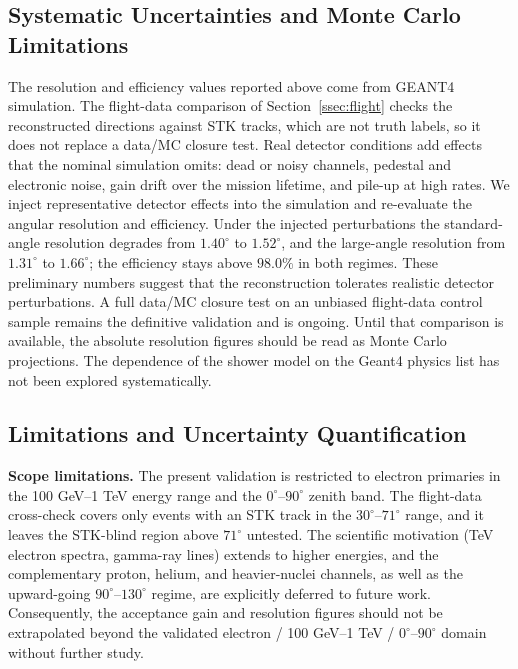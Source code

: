 \documentclass[preprint,12pt]{elsarticle}
\begin{document}
\subsection{Systematic Uncertainties and Monte Carlo Limitations}
\label{ssec:systematics}

The resolution and efficiency values reported above come from GEANT4
simulation. The flight-data comparison of Section~\ref{ssec:flight} checks
the reconstructed directions against STK tracks, which are not truth labels,
so it does not replace a data/MC closure test. Real detector conditions add
effects that the nominal simulation omits: dead or noisy channels, pedestal
and electronic noise, gain drift over the mission lifetime, and pile-up at
high rates. We inject representative detector effects into the simulation
and re-evaluate the angular resolution and efficiency. Under the injected
perturbations the standard-angle resolution degrades from $1.40^{\circ}$ to
$1.52^{\circ}$, and the large-angle resolution from $1.31^{\circ}$ to
$1.66^{\circ}$; the efficiency stays above $98.0\%$ in both regimes. These
preliminary numbers suggest that the reconstruction tolerates realistic
detector perturbations. A full data/MC closure test on an unbiased
flight-data control sample remains the definitive validation and is ongoing.
Until that comparison is available, the absolute resolution figures should
be read as Monte Carlo projections. The dependence of the shower model on
the Geant4 physics list has not been explored systematically.

\subsection{Limitations and Uncertainty Quantification}
\label{ssec:limitations}

\textbf{Scope limitations.} The present validation is restricted to electron primaries in the 100 GeV--1 TeV energy range and the $0^{\circ}$--$90^{\circ}$ zenith band. The flight-data cross-check covers only events with an STK track in the $30^{\circ}$--$71^{\circ}$ range, and it leaves the STK-blind region above $71^{\circ}$ untested. The scientific motivation (TeV electron spectra, gamma-ray lines) extends to higher energies, and the complementary proton, helium, and heavier-nuclei channels, as well as the upward-going $90^{\circ}$--$130^{\circ}$ regime, are explicitly deferred to future work. Consequently, the acceptance gain and resolution figures should not be extrapolated beyond the validated electron / 100 GeV--1 TeV / $0^{\circ}$--$90^{\circ}$ domain without further study.
\end{document}
